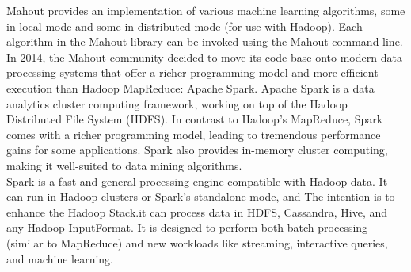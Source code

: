 Mahout provides an implementation of various machine learning algorithms, some in local mode and some in distributed mode (for use with Hadoop). Each algorithm in the Mahout library can be invoked using the Mahout command line.
\\
In 2014, the Mahout community decided to move its code base onto modern data processing systems that offer a richer programming model and more efficient execution than Hadoop MapReduce: Apache Spark. Apache Spark is a data analytics cluster computing framework, working on top of the Hadoop Distributed File System (HDFS). In contrast to Hadoop’s MapReduce, Spark comes with a richer programming model, leading to tremendous performance gains for some applications. Spark also provides in-memory cluster computing, making it well-suited to data mining algorithms. 
\\
Spark is a fast and general processing engine compatible with Hadoop data. It can run in Hadoop clusters or Spark's standalone mode, and The intention is to enhance the Hadoop Stack.it can process data in HDFS, Cassandra, Hive, and any Hadoop InputFormat. It is designed to perform both batch processing (similar to MapReduce) and new workloads like streaming, interactive queries, and machine learning.


